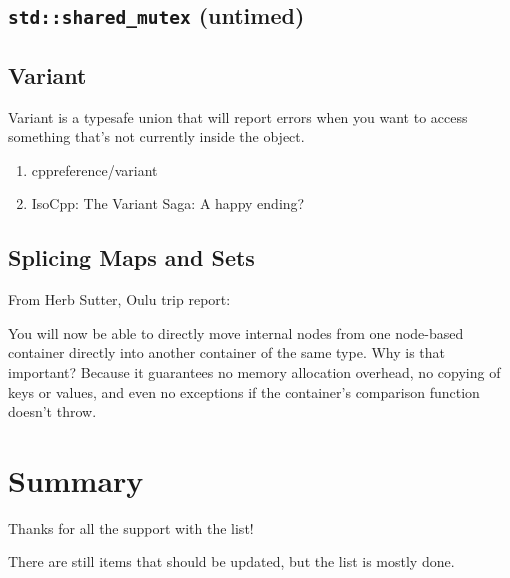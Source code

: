 \subsection{\texttt{std::shared_mutex} (untimed)}

\subsection{Variant}

Variant is a typesafe union that will report errors when you want to access something that’s not currently inside the object.

\begin{enumerate}
\item cppreference/variant
\item IsoCpp: The Variant Saga: A happy ending?
\end{enumerate}

\subsection{Splicing Maps and Sets}

From Herb Sutter, Oulu trip report:

You will now be able to directly move internal nodes from one node-based container directly into another container of the same type. Why is that important? Because it guarantees no memory allocation overhead, no copying of keys or values, and even no exceptions if the container’s comparison function doesn’t throw.

\section{Summary}
Thanks for all the support with the list!

There are still items that should be updated, but the list is mostly done.